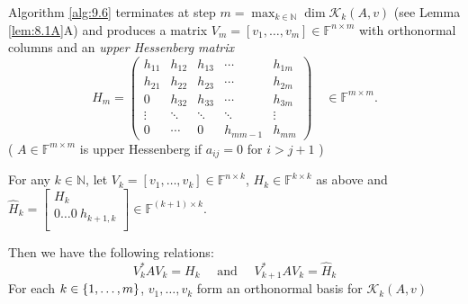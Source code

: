\documentclass[12pt]{article}
\theoremstyle{definition}
\theoremstyle{remark}
\numberwithin{equation}{section}
\newcommand{\F}{\mathbb{F}}
\newcommand{\N}{\mathbb{N}}
\newcommand{\K}{\mathcal{K}}
\newcommand{\blockVertical}[2]{
  \left[
    \begin{array}{c}
      #1\\\hline
      #2\\
    \end{array}
  \right]
}
\DeclarePairedDelimiter{\set}{\{}{\}}
\begin{document}
  Algorithm \ref{alg:9.6} terminates at step $m = \max_{k \in \N} \dim \K_k(A,v)$ (see Lemma \ref{lem:8.1A}A) and produces a matrix $V_m = [v_1,\ldots,v_m] \in \F^{n\times m}$ with orthonormal columns and an \emph{upper Hessenberg matrix}
  \begin{equation*}
    H_m =
    \begin{pmatrix}
      h_{11} & h_{12} & h_{13} & \cdots & h_{1m}\\
      h_{21} & h_{22} & h_{23} & \cdots & h_{2m}\\
      0 & h_{32} & h_{33} &\cdots & h_{3m}\\
      \vdots & \ddots & \ddots  &\ddots & \vdots\\
      0 & \cdots & 0 & h_{mm-1} & h_{mm}
    \end{pmatrix} \quad \in \F^{m\times m}.
  \end{equation*}
  ( $A \in \F^{m \times m}$ is upper Hessenberg if $a_{ij} = 0$ for $i > j+1$ )

  For any $k \in \N$, let $V_k = [v_1,\ldots,v_k] \in \F^{n\times k}$, $H_k \in \F^{k \times k}$ as above and $\hat{H}_k = \blockVertical{H_k}{0 \ldots 0\ h_{k+1,k}} \in \F^{(k+1)\times k}$.

  Then we have the following relations:
  \begin{equation*}
    V_k^* A V_k = H_k \quad \text{ and } \quad V_{k+1}^* A V_k = \hat{H}_k
  \end{equation*}
  For each $k \in \set{1,\ldots,m}$, $v_1, \ldots, v_k$ form an orthonormal basis for $\K_k(A,v)$
\end{document}
